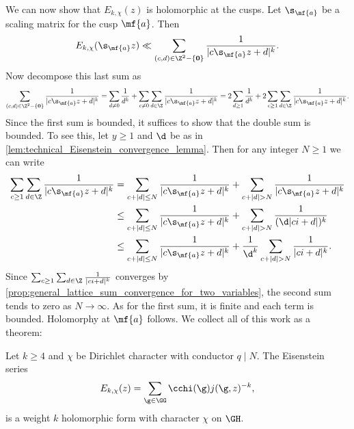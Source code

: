     We can now show that $E_{k,\chi}(z)$ is holomorphic at the cusps. Let $\s_{\mf{a}}$ be a scaling matrix for the cusp $\mf{a}$. Then
    \[
      E_{k,\chi}(\s_{\mf{a}}z) \ll \sum_{(c,d) \in \Z^{2}-\{\mathbf{0}\}}\frac{1}{|c\s_{\mf{a}}z+d|^{k}}.
    \]
    Now decompose this last sum as
    \[
      \sum_{(c,d) \in \Z^{2}-\{\mathbf{0}\}}\frac{1}{|c\s_{\mf{a}}z+d|^{k}} = \sum_{d \neq 0}\frac{1}{d^{k}}+\sum_{c \neq 0}\sum_{d \in \Z}\frac{1}{|c\s_{\mf{a}}z+d|^{k}} = 2\sum_{d \ge 1}\frac{1}{d^{k}}+2\sum_{c \ge 1}\sum_{d \in \Z}\frac{1}{|c\s_{\mf{a}}z+d|^{k}}.
    \]
    Since the first sum is bounded, it suffices to show that the double sum is bounded. To see this, let $y \ge 1$ and $\d$ be as in \cref{lem:technical_Eisenstein_convergence_lemma}. Then for any integer $N \ge 1$ we can write
    \begin{align*}
      \sum_{c \ge 1}\sum_{d \in \Z}\frac{1}{|c\s_{\mf{a}}z+d|^{k}} &= \sum_{c+|d| \le N}\frac{1}{|c\s_{\mf{a}}z+d|^{k}}+\sum_{c+|d| > N}\frac{1}{|c\s_{\mf{a}}z+d|^{k}} \\
      &\le \sum_{c+|d| \le N}\frac{1}{|c\s_{\mf{a}}z+d|^{k}}+\sum_{c+|d| > N}\frac{1}{(\d|ci+d|)^{k}} \\
      &\le \sum_{c+|d| \le N}\frac{1}{|c\s_{\mf{a}}z+d|^{k}}+\frac{1}{\d^{k}}\sum_{c+|d| > N}\frac{1}{|ci+d|^{k}}.
    \end{align*}
    Since $\sum_{c \ge 1}\sum_{d \in \Z}\frac{1}{|ci+d|^{k}}$ converges by \cref{prop:general_lattice_sum_convergence_for_two_variables}, the second sum tends to zero as $N \to \infty$. As for the first sum, it is finite and each term is bounded. Holomorphy at $\mf{a}$ follows. We collect all of this work as a theorem:

    \begin{theorem}
      Let $k \ge 4$ and $\chi$ be Dirichlet character with conductor $q \mid N$. The Eisenstein series
      \[
        E_{k,\chi}(z) = \sum_{\g \in \GG}\cchi(\g)j(\g,z)^{-k},
      \]
      is a weight $k$ holomorphic form with character $\chi$ on $\GH$.
    \end{theorem}

